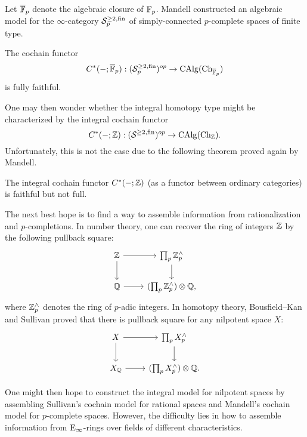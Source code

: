 Let $\overline{{\mathbb{F}}}_p$ denote the algebraic closure of ${\mathbb{F}}_p$. Mandell constructed an algebraic model for the $\infty$-category ${\mathcal{S}}^{\geq 2, \operatorname{fin}}_p$ of simply-connected $p$-complete spaces of finite type.
\begin{theorem}
    \cite{Mandell_p-adic}
    The cochain functor 
    $$
    C^*(-;\overline{{\mathbb{F}}}_p): 
    ({\mathcal{S}}^{\geq 2, \operatorname{fin}}_p)^{op} 
    \to 
    \operatorname{CAlg}(\operatorname{Ch}_{\overline{{\mathbb{F}}}_p})
    $$
    is fully faithful.
\end{theorem}
One may then wonder whether the integral homotopy type might be characterized by the integral cochain functor
$$
C^*(-;{\mathbb{Z}}): 
    ({\mathcal{S}}^{\geq 2, \operatorname{fin}})^{op} 
    \to 
    \operatorname{CAlg}(\operatorname{Ch}_{{\mathbb{Z}}}).
$$
Unfortunately, this is not the case due to the following theorem proved again by Mandell.
\begin{theorem}
    \cite{Mandell_Cochain}
    The integral cochain functor $C^*(-;{\mathbb{Z}})$ (as a functor between ordinary categories) is faithful but not full.
\end{theorem}

The next best hope is to find a way to assemble information from rationalization and $p$-completions.
In number theory, one can recover the ring of integers ${\mathbb{Z}}$ by the following pullback square:
\[
\begin{tikzcd}
\BZ & \prod_{p} \BZ^{\wedge}_{p}  \\
\BQ & (\prod_{p} \BZ^{\wedge}_{p}) \otimes \BQ,
        \arrow[from=1-1, to=1-2]
		\arrow[from=2-1, to=2-2]
		\arrow[from=1-1, to=2-1]
		\arrow[from=1-2, to=2-2]
\end{tikzcd}
\]
where ${\mathbb{Z}}^{\wedge}_p$ denotes the ring of $p$-adic integers. In homotopy theory, Bousfield--Kan \cite{Bousfield-KanYellow} and Sullivan \cite{Sullivan05} proved that there is pullback square for any nilpotent space $X$:
\[
\begin{tikzcd}
X & \prod_{p} X^{\wedge}_{p}  \\
X_\BQ & (\prod_{p} X^{\wedge}_{p}) \otimes \BQ.
        \arrow[from=1-1, to=1-2]
		\arrow[from=2-1, to=2-2]
		\arrow[from=1-1, to=2-1]
		\arrow[from=1-2, to=2-2]
\end{tikzcd}
\]

One might then hope to construct the integral model for nilpotent spaces by assembling Sullivan's cochain model for rational spaces and Mandell's cochain model for $p$-complete spaces. However, the difficulty lies in how to assemble information from $\operatorname{E}_{\infty}$-rings over fields of different characteristics.

